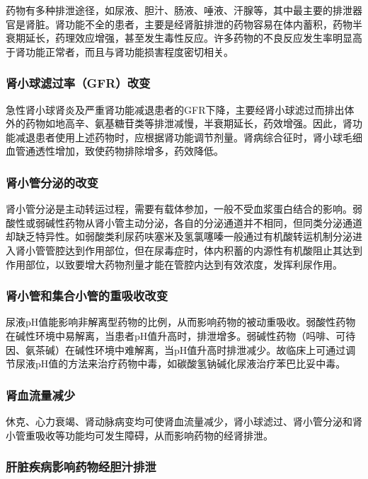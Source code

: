 药物有多种排泄途径，如尿液、胆汁、肠液、唾液、汗腺等，其中最主要的排泄器官是肾脏。肾功能不全的患者，主要是经肾脏排泄的药物容易在体内蓄积，药物半衰期延长，药理效应增强，甚至发生毒性反应。许多药物的不良反应发生率明显高于肾功能正常者，而且与肾功能损害程度密切相关。

\subsubsection{肾小球滤过率（GFR）改变}

急性肾小球肾炎及严重肾功能减退患者的GFR下降，主要经肾小球滤过而排出体外的药物如地高辛、氨基糖苷类等排泄减慢，半衰期延长，药效增强。因此，肾功能减退患者使用上述药物时，应根据肾功能调节剂量。肾病综合征时，肾小球毛细血管通透性增加，致使药物排除增多，药效降低。

\subsubsection{肾小管分泌的改变}

肾小管分泌是主动转运过程，需要有载体参加，一般不受血浆蛋白结合的影响。弱酸性或弱碱性药物从肾小管主动分泌，各自的分泌通道并不相同，但同类分泌通道却缺乏特异性。如弱酸类利尿药呋塞米及氢氯噻嗪一般通过有机酸转运机制分泌进入肾小管管腔达到作用部位，但在尿毒症时，体内积蓄的内源性有机酸阻止其达到作用部位，以致要增大药物剂量才能在管腔内达到有效浓度，发挥利尿作用。

\subsubsection{肾小管和集合小管的重吸收改变}

尿液pH值能影响非解离型药物的比例，从而影响药物的被动重吸收。弱酸性药物在碱性环境中易解离，当患者pH值升高时，排泄增多。弱碱性药物（吗啡、可待因、氨茶碱）在碱性环境中难解离，当pH值升高时排泄减少。故临床上可通过调节尿液pH值的方法来治疗药物中毒，如碳酸氢钠碱化尿液治疗苯巴比妥中毒。

\subsubsection{肾血流量减少}

休克、心力衰竭、肾动脉病变均可使肾血流量减少，肾小球滤过、肾小管分泌和肾小管重吸收等功能均可发生障碍，从而影响药物的经肾排泄。

\subsubsection{肝脏疾病影响药物经胆汁排泄}

